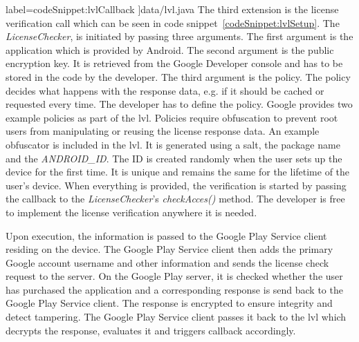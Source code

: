   label={codeSnippet:lvlCallback}
]{data/lvl.java}
The third extension is the license verification call which can be seen in code snippet~\ref{codeSnippet:lvlSetup}.
The \textit{LicenseChecker}, is initiated by passing three arguments.
The first argument is the application which is provided by Android.
The second argument is the public encryption key.
It is retrieved from the Google Developer console and has to be stored in the code by the developer.
\newline
The third argument is the policy.
The policy decides what happens with the response data, e.g. if it should be cached or requested every time.
The developer has to define the policy.
Google provides two example policies as part of the \gls{lvl}.
Policies require obfuscation to prevent root users from manipulating or reusing the license response data.
An example obfuscator is included in the \gls{lvl}.
It is generated using a salt, the package name and the \textit{ANDROID\_ID}.
The ID is created randomly when the user sets up the device for the first time.
It is unique and remains the same for the lifetime of the user's device.
\newline
When everything is provided, the verification is started by passing  the callback to the \textit{LicenseChecker}'s \textit{checkAcces()} method.
The developer is free to implement the license verification anywhere it is needed.
\cite{developersLicensingOverview} \cite{developersLicensingSetup} \cite{developersLicensingAdding} \cite{digipomLvl}
\newline

Upon execution, the information is passed to the Google Play Service client residing on the device.
The Google Play Service client then adds the primary Google account username and other information and sends the license check request to the server.
On the Google Play server, it is checked whether the user has purchased the application and a corresponding response is send back to the Google Play Service client.
The response is encrypted to ensure integrity and detect tampering.
The Google Play Service client passes it back to the \gls{lvl} which decrypts the response, evaluates it and triggers callback accordingly. \cite{developersLicensingOverview} \cite{developersLicensingSetup} \cite{developersLicensingAdding} \cite{digipomLvl}
